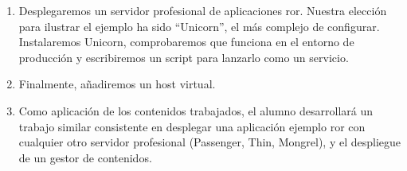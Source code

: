 \documentclass{beamer}
\begin{document}
\begin{frame}
\begin{enumerate}
\item Desplegaremos un servidor profesional de aplicaciones \acrshort{ror}. Nuestra elección para ilustrar el ejemplo
ha sido ``Unicorn'', el más complejo de configurar. Instalaremos Unicorn, comprobaremos que funciona en el entorno de 
producción y escribiremos un script para lanzarlo como un servicio.

\item Finalmente, añadiremos un host virtual.

\item Como aplicación de los contenidos trabajados, el alumno desarrollará un trabajo similar consistente en desplegar una aplicación 
ejemplo \acrshort{ror} con cualquier otro servidor profesional (Passenger, Thin, Mongrel), y el despliegue de un gestor de contenidos.

\end{enumerate}
\end{frame}
\end{document}
